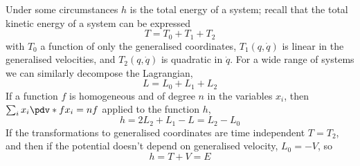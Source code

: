 Under some circumstances $h$ is the total energy of a system; recall
that the total kinetic energy of a system can be expressed
\begin{equation}
  \label{eq:93}
  T = T_0 + T_1 + T_2
\end{equation}
with $T_0$ a function of only the generalised coordinates, $T_1(q,
\dot{q})$ is linear in the generalised velocities, and $T_2(q,
\dot{q})$ is quadratic in $\dot{q}$. For a wide range of systems we
can similarly decompose the Lagrangian,
\begin{equation}
  \label{eq:94}
  L = L_0 + L_1 + L_2
\end{equation}
If a function $f$ is homogeneous and of degree $n$ in the variables
$x_i$, then
$
  \sum_i x_i \pdv*{f}{x_i} = nf
$
applied to the function $h$,
\begin{equation}
  \label{eq:96}
  h = 2 L_2 + L_1 - L = L_2 - L_0
\end{equation}
If the transformations to generalised coordinates are time independent $T = T_2$, and then if the potential doesn't depend on generalised velocity, $L_0 = -V$, so
\begin{equation}
  \label{eq:97}
  h = T + V = E
\end{equation}
